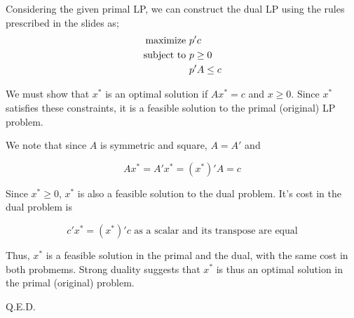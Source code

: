 Considering the given primal LP, we can construct the dual LP using the rules prescribed in the slides as; \\

\begin{align}
    \text{maximize } &p'c \notag\\
    \text{subject to } &p \ge 0 \notag\\
                    &p'A \le c \notag
\end{align}

We must show that $x^*$ is an optimal solution if $Ax^*=c$ and $x\geq 0$. Since $x^*$ satisfies these constraints, it is a feasible solution to the primal (original) LP problem.

We note that since $A$ is symmetric and square, $A=A'$ and

\[Ax^*=A'x^*=(x^*)'A=c\]

Since $x^*\geq 0$, $x^*$ is also a feasible solution to the dual problem. It's cost in the dual problem is

\[c'x^* = (x^*)'c \text{ as a scalar and its transpose are equal}\]

Thus, $x^*$ is a feasible solution in the primal and the dual, with the same cost in both probmems. Strong duality suggests that $x^*$ is thus an optimal solution in the primal (original) problem.

Q.E.D.


